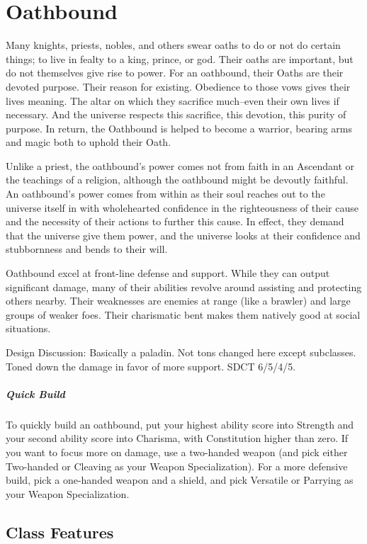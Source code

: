 \section{Oathbound\label{class:oathbound}}

Many knights, priests, nobles, and others swear oaths to do or not do certain things; to live in fealty to a king, prince, or god. Their oaths are important, but do not themselves give rise to power. For an oathbound, their Oaths are their devoted purpose. Their reason for existing. Obedience to those vows gives their lives meaning. The altar on which they sacrifice much--even their own lives if necessary. And the universe respects this sacrifice, this devotion, this purity of purpose. In return, the Oathbound is helped to become a warrior, bearing arms and magic both to uphold their Oath.

Unlike a priest, the oathbound's power comes not from faith in an Ascendant or the teachings of a religion, although the oathbound might be devoutly faithful. An oathbound's power comes from within as their soul reaches out to the universe itself in with wholehearted confidence in the righteousness of their cause and the necessity of their actions to further this cause. In effect, they demand that the universe give them power, and the universe looks at their confidence and stubbornness and bends to their will.

Oathbound excel at front-line defense and support. While they can output significant damage, many of their abilities revolve around assisting and protecting others nearby. Their weaknesses are enemies at range (like a brawler) and large groups of weaker foes. Their charismatic bent makes them natively good at social situations.

Design Discussion: Basically a paladin. Not tons changed here except subclasses. Toned down the damage in favor of more support. SDCT 6/5/4/5.

\subparagraph*{Quick Build}
To quickly build an oathbound, put your highest ability score into Strength and your second ability score into Charisma, with Constitution higher than zero. If you want to focus more on damage, use a two-handed weapon (and pick either Two-handed or Cleaving as your Weapon Specialization). For a more defensive build, pick a one-handed weapon and a shield, and pick Versatile or Parrying as your Weapon Specialization.

\subsection{Class Features}

